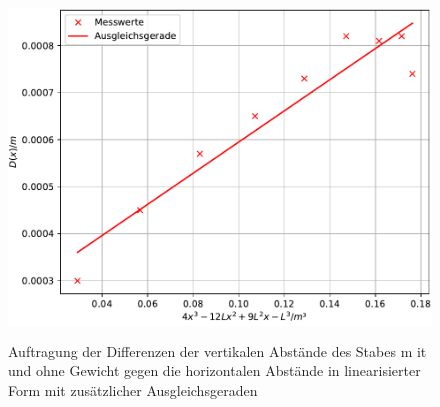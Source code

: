 



\begin{figure}
  \centering
  \includegraphics[width=12cm, height=9cm]{./plots/Stange3b.pdf}
  \caption{Auftragung der Differenzen der vertikalen Abstände des Stabes m      it und ohne Gewicht gegen die horizontalen Abstände in linearisierter Form       mit zusätzlicher Ausgleichsgeraden}
  \label{fig:plot3b}
\end{figure}
